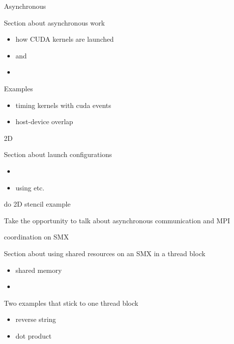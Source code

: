 
\begin{frame}[fragile]{Asynchronous}
    \begin{info}{}
        Section about asynchronous work
        \begin{itemize}
            \item how CUDA kernels are launched
            \item {} and 
            \item {}
        \end{itemize}
        Examples
        \begin{itemize}
            \item timing kernels with cuda events
            \item host-device overlap
        \end{itemize}
    \end{info}

\end{frame}


\begin{frame}[fragile]{2D}
    \begin{info}{}
        Section about launch configurations
        \begin{itemize}
            \item {}
            \item using  etc.
        \end{itemize}
        do 2D stencil example

        Take the opportunity to talk about asynchronous communication and MPI
    \end{info}

\end{frame}

\begin{frame}[fragile]{coordination on SMX}
    \begin{info}{}
        Section about using shared resources on an SMX in a thread block
        \begin{itemize}
            \item shared memory
            \item {}
        \end{itemize}
        Two examples that stick to one thread block
        \begin{itemize}
            \item reverse string
            \item dot product
        \end{itemize}
    \end{info}

\end{frame}

